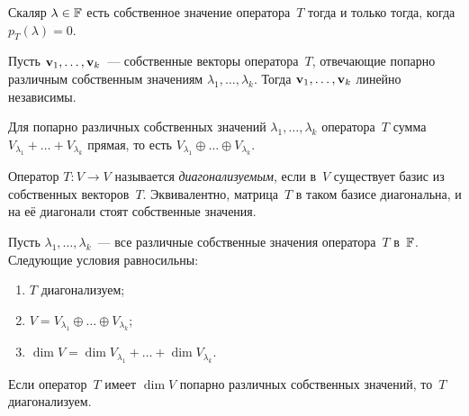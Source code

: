 \begin{theorem}
\label{thm:eigvals-roots}
Скаляр $\lambda \in \mathbb{F}$ есть собственное значение оператора~$T$ тогда и
только тогда, когда $p_T(\lambda) = 0$.
\end{theorem}

\begin{theorem}
\label{thm:distinct-eig-li}
Пусть $\mathbf{v}_1, \dots, \mathbf{v}_k$~--- собственные векторы
оператора~$T$, отвечающие попарно различным собственным значениям
$\lambda_1, \dots, \lambda_k$. Тогда $\mathbf{v}_1, \dots, \mathbf{v}_k$
линейно независимы.
\end{theorem}

\begin{corollary}
\label{cor:eigspaces-direct-sum}
Для попарно различных собственных значений $\lambda_1, \dots, \lambda_k$
оператора~$T$ сумма $V_{\lambda_1} + \dots + V_{\lambda_k}$ прямая, то
есть $V_{\lambda_1} \oplus \dots \oplus V_{\lambda_k}$.
\end{corollary}

\begin{definition}
\label{def:diagonalizable}
Оператор $T \colon V \to V$ называется \emph{диагонализуемым}, если
в~$V$ существует базис из собственных векторов~$T$. Эквивалентно,
матрица~$T$ в таком базисе диагональна, и на её диагонали стоят
собственные значения.
\end{definition}

\begin{theorem}
\label{thm:diag-criterion}
Пусть $\lambda_1, \dots, \lambda_k$~--- все различные собственные
значения оператора~$T$ в~$\mathbb{F}$. Следующие условия равносильны:
\begin{enumerate}[label=(\alph*)]
  \item $T$ диагонализуем;
  \item $V = V_{\lambda_1} \oplus \dots \oplus V_{\lambda_k}$;
  \item $\dim V = \dim V_{\lambda_1} + \dots + \dim V_{\lambda_k}$.
\end{enumerate}
\end{theorem}

\begin{corollary}
\label{cor:distinct-implies-diag}
Если оператор~$T$ имеет $\dim V$ попарно различных собственных
значений, то~$T$ диагонализуем.
\end{corollary}

